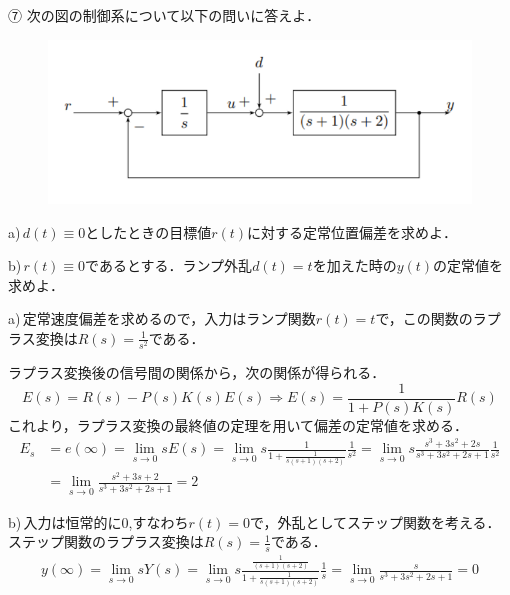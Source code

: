⑦ 次の図の制御系について以下の問いに答えよ．
\begin{figure}[H]
    \centering
    \includegraphics[scale=0.75]{figure1.pdf}
\end{figure}

a)\,$d(t)\equiv 0$としたときの目標値$r(t)$に対する定常位置偏差を求めよ．

b)\,$r(t)\equiv 0$であるとする．ランプ外乱$d(t)=t$を加えた時の$y(t)$の定常値を求めよ．

a)\,定常速度偏差を求めるので，入力はランプ関数$r(t)=t$で，この関数のラプラス変換は$R(s)=\frac{1}{s^2}$である．

ラプラス変換後の信号間の関係から，次の関係が得られる．
$$
E(s)=R(s)-P(s) K(s) E(s) \Rightarrow E(s)=\frac{1}{1+P(s) K(s)} R(s)
$$
これより，ラプラス変換の最終値の定理を用いて偏差の定常値を求める．
$$
\begin{aligned}
E_s & =e(\infty)=\lim _{s \rightarrow 0} s E(s)=\lim _{s \rightarrow 0} s \frac{1}{1+\frac{1}{s(s+1)(s+2)}} \frac{1}{s^2}=\lim _{s \rightarrow 0} s \frac{s^3+3 s^2+2 s}{s^3+3 s^2+2 s+1} \frac{1}{s^2} \\
& =\lim _{s \rightarrow 0} \frac{s^2+3 s+2}{s^3+3 s^2+2 s+1}=2
\end{aligned}
$$

b)\,入力は恒常的に0,すなわち$r(t)=0$で，外乱としてステップ関数を考える．ステップ関数のラプラス変換は$R(s)=\frac{1}{s}$である．
$$
\begin{aligned}
y(\infty) =\lim _{s \rightarrow 0} s Y(s)=\lim _{s \rightarrow 0} s \frac{\frac{1}{(s+1)(s+2)}}{1+\frac{1}{s(s+1)(s+2)}} \frac{1}{s}=\lim _{s \rightarrow 0} \frac{s}{s^3+3 s^2+2 s+1} = 0
\end{aligned}
$$